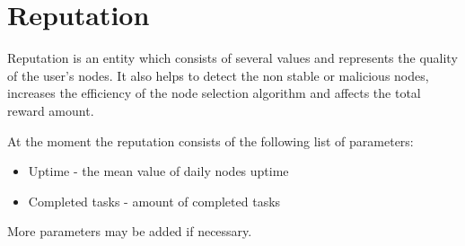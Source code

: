 \section{Reputation}

Reputation is an entity which consists of several values and represents the quality of the user's nodes.
It also helps to detect the non stable or malicious nodes,
increases the efficiency of the node selection algorithm and
affects the total reward amount.

At the moment the reputation consists of the following list of parameters:

\begin{itemize}
    \item Uptime - the mean value of daily nodes uptime
    \item Completed tasks - amount of completed tasks
\end{itemize}

More parameters may be added if necessary.
